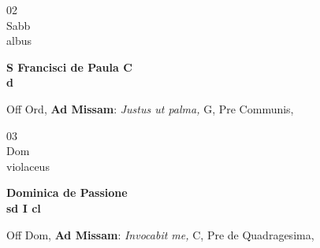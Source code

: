 \documentclass[10pt, openany]{book}
\begin{document}
        \begin{center}
            \begin{minipage}{3.5in}
                \vspace{2em}
                \begin{minipage}{0.5in}
                    {\Huge 02} \\
                    {\normalsize Sabb} \\
                    {\normalsize albus}
                \end{minipage}
                \begin{minipage}{3.0in}
                    \textbf{ \large S Francisci de Paula C \\
                    \textnormal{\normalsize d}} \\ 
                \end{minipage}
                \begin{justify}Off Ord, \textbf{Ad Missam}: \textit{Justus ut palma,} G, Pre Communis,  
                \end{justify}
            \end{minipage}
        \end{center}
    
        \begin{center}
            \begin{minipage}{3.5in}
                \vspace{2em}
                \begin{minipage}{0.5in}
                    {\Huge 03} \\
                    {\normalsize Dom} \\
                    {\normalsize violaceus}
                \end{minipage}
                \begin{minipage}{3.0in}
                    \textbf{ \large Dominica de Passione \\
                    \textnormal{\normalsize sd I cl}} \\ 
                \end{minipage}
                \begin{justify}Off Dom, \textbf{Ad Missam}: \textit{Invocabit me,} C, Pre de Quadragesima,  
                \end{justify}
            \end{minipage}
        \end{center}
    
\end{document}
